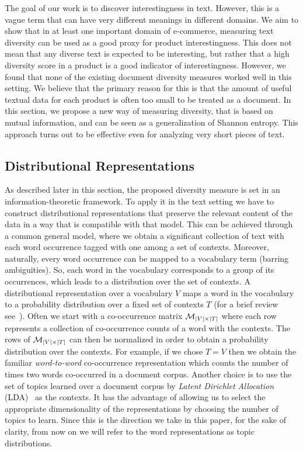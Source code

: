The goal of our work is to discover interestingness in text. However,
this is a vague term that can have very different meanings in different
domains. We aim to show that in at least one important domain of
e-commerce, measuring text diversity can be used as a good proxy for 
product interestingness. This does not mean that any diverse text is
expected to be interesting, but rather that a high diversity score in
a product is a good indicator of interestingness. However, we found
that none of the existing 
document diversity measures worked well in this setting. We believe
that the primary reason for this is that the amount of useful textual
data for each product is often too small to be treated as a document. 
In this section, we propose a new way of measuring diversity, that is
based on mutual information, and can be seen as a generalization of
Shannon entropy. This approach turns out to be effective even for
analyzing very short pieces of text. 


\subsection{Distributional Representations}
\label{sec:distributional-representations}
As described later in this section, the proposed diversity measure
is set in an information-theoretic framework. To apply it in the text
setting we have to construct distributional representations that
preserve the relevant content of the data in a way that is compatible
with that model.
This can be achieved through a common general model,
where we obtain a significant collection of text with each word
occurrence tagged with one among a set of
contexts. Moreover, naturally, every word occurrence can be mapped to a
vocabulary term (barring ambiguities). So, each word in the vocabulary
corresponds to a group of its occurrences, which leads to a
distribution over the set of contexts. A distributional representation
over a vocabulary $V$ maps a word in the vocabulary to a  
probability distribution over a fixed set of contexts $T$  (for a brief review
see~\cite{Turian10wordrepresentations}). Often we start with a
co-occurrence matrix ${\mathcal M}_{|V|\times|T|}$ where each row represents a
collection of co-occurrence counts of a word with the contexts. The
rows of ${\mathcal M}_{|V|\times|T|}$ can then  be normalized in order to
obtain a probability distribution over the contexts.
For example, if we chose $T=V$ then we obtain the familiar {\sl
  word-to-word} co-occurrence representation which counts the number 
of times two words co-occurred in a document corpus. Another choice is
to use the set of topics learned over a document 
corpus by {\sl Latent Dirichlet Allocation}
(LDA)~\cite{Blei:2003:LDA:944919.944937} as the contexts. It has the
advantage of allowing us to select the appropriate dimensionality of
the representations by choosing the number of topics to learn. Since
this is the direction we take in this paper, for the sake
of clarity, from now on we will refer to the
word representations as topic distributions. 

